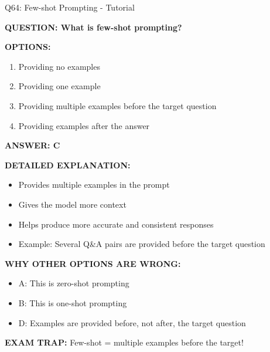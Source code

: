 \documentclass[8pt]{beamer}
\begin{document}
\begin{frame}{Q64: Few-shot Prompting - Tutorial}
	\fontsize{6.5}{7.5}\selectfont
	
	\textbf{QUESTION: What is few-shot prompting?}
	
	\vspace{0.1cm}
	\textbf{OPTIONS:}
	\begin{enumerate}
		\item Providing no examples
		\item Providing one example
		\item Providing multiple examples before the target question
		\item Providing examples after the answer
	\end{enumerate}
	
	\vspace{0.1cm}
	\textcolor{myblue}{\textbf{ANSWER: C}}
	
	\vspace{0.1cm}
	\textbf{DETAILED EXPLANATION:}
	\begin{itemize}
		\item Provides multiple examples in the prompt
		\item Gives the model more context
		\item Helps produce more accurate and consistent responses
		\item Example: Several Q\&A pairs are provided before the target question
	\end{itemize}
	
	\vspace{0.1cm}
	\textcolor{myred}{\textbf{WHY OTHER OPTIONS ARE WRONG:}}
	\begin{itemize}
		\item \textcolor{myred}{A:} This is zero-shot prompting
		\item \textcolor{myred}{B:} This is one-shot prompting
		\item \textcolor{myred}{D:} Examples are provided before, not after, the target question
	\end{itemize}
	
	\textcolor{myred}{\textbf{EXAM TRAP:}}
	Few-shot = \textcolor{myblue}{multiple examples before the target}!
\end{frame}
\end{document}

